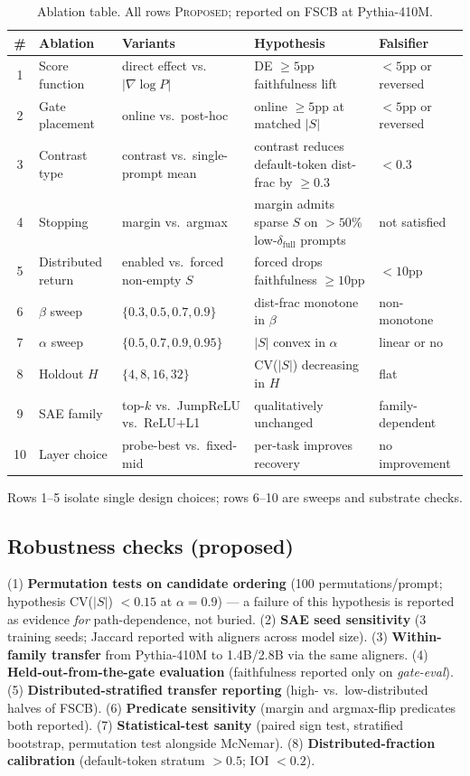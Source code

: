 \documentclass[10pt]{article}
\begin{document}
\begin{table}[t]
\centering
\footnotesize
\caption{Ablation table. All rows \textsc{Proposed}; reported on FSCB at Pythia-410M.}
\label{tab:ablations}
\begin{tabular}{@{}cp{2.0cm}p{3.5cm}p{4.6cm}p{2.4cm}@{}}
\toprule
\# & Ablation & Variants & Hypothesis & Falsifier \\
\midrule
1 & Score function & direct effect vs.\ $|\nabla \log P|$ & DE $\geq 5$pp faithfulness lift & $<5$pp or reversed \\
2 & Gate placement & online vs.\ post-hoc & online $\geq 5$pp at matched $|S|$ & $<5$pp or reversed \\
3 & Contrast type & contrast vs.\ single-prompt mean & contrast reduces default-token dist-frac by $\geq 0.3$ & $<0.3$ \\
4 & Stopping & margin vs.\ argmax & margin admits sparse $S$ on $>50\%$ low-$\delta_{\text{full}}$ prompts & not satisfied \\
5 & Distributed return & enabled vs.\ forced non-empty $S$ & forced drops faithfulness $\geq 10$pp & $<10$pp \\
6 & $\beta$ sweep & $\{0.3, 0.5, 0.7, 0.9\}$ & dist-frac monotone in $\beta$ & non-monotone \\
7 & $\alpha$ sweep & $\{0.5, 0.7, 0.9, 0.95\}$ & $|S|$ convex in $\alpha$ & linear or no \\
8 & Holdout $H$ & $\{4, 8, 16, 32\}$ & CV($|S|$) decreasing in $H$ & flat \\
9 & SAE family & top-$k$ vs.\ JumpReLU vs.\ ReLU+L1 & qualitatively unchanged & family-dependent \\
10 & Layer choice & probe-best vs.\ fixed-mid & per-task improves recovery & no improvement \\
\bottomrule
\end{tabular}
\end{table}

Rows 1--5 isolate single design choices; rows 6--10 are sweeps and substrate checks.

\subsection{Robustness checks (proposed)}

(1) \textbf{Permutation tests on candidate ordering} (100 permutations/prompt; hypothesis CV($|S|$) $<0.15$ at $\alpha=0.9$) --- a failure of this hypothesis is reported as evidence \emph{for} path-dependence, not buried. (2) \textbf{SAE seed sensitivity} (3 training seeds; Jaccard reported with \citealp{lan2024sparse} aligners across model size). (3) \textbf{Within-family transfer} from Pythia-410M to 1.4B/2.8B via the same aligners. (4) \textbf{Held-out-from-the-gate evaluation} (faithfulness reported only on \emph{gate-eval}). (5) \textbf{Distributed-stratified transfer reporting} (high- vs.\ low-distributed halves of FSCB). (6) \textbf{Predicate sensitivity} (margin and argmax-flip predicates both reported). (7) \textbf{Statistical-test sanity} (paired sign test, stratified bootstrap, permutation test alongside McNemar). (8) \textbf{Distributed-fraction calibration} (default-token stratum $> 0.5$; IOI $< 0.2$).
\end{document}
